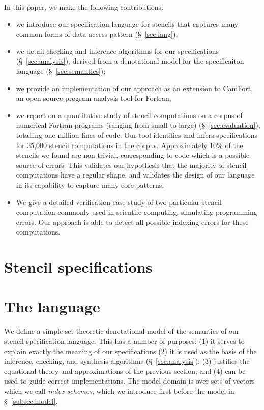 \documentclass[9pt,preprint]{sigplanconf}
\theoremstyle{definition}
\begin{document}
In this paper, we make the following contributions:
%
\begin{itemize}
\item we introduce our specification language for stencils
  that captures many common forms of data access pattern
  (\S~\ref{sec:lang});

\item we detail checking and inference algorithms for our
  specifications (\S~\ref{sec:analysis}), derived from a
  denotational model for the specificaiton language
  (\S~\ref{sec:semantics});

\item we provide an implementation of our approach as an extension to
  CamFort, an open-source program analysis tool for Fortran;

\item we report on a quantitative study of stencil computations on a
  corpus of numerical Fortran programs (ranging from small to large)
  (\S~\ref{sec:evaluation}), totalling one million lines of code. Our tool
  identifies and infers specifications for 35,000 stencil computations in the
  corpus. Approximately 10\% of the stencils we found are non-trivial,
  corresponding to code which is a possible source of errors. This validates
  our hypothesis that the majority of stencil computations have a regular
  shape, and validates the design of our language in its capability to capture
  many core patterns.

\item We give a detailed verification case study of two
  particular stencil computation commonly used in scientifc computing,
  simulating programming errors. Our approach is able to detect all
  possible indexing errors for these computations.
\end{itemize}
%

\newcommand{\domainVal}{\mathbb{Z}_\infty}
\section{Stencil specifications}

\section{The language}

We define a simple set-theoretic denotational model of the semantics
of our stencil specification language. This has a number of purposes:
(1) it serves to explain exactly the meaning of our specifications
(2) it is 
used as the basis of the inference, checking, and synthesis algorithms
(\S~\ref{sec:analysis}); (3) justifies the equational theory and
approximations of the previous section; and (4) can be used to guide
correct implementations. The model domain is over sets of vectors
which we call \emph{index schemes}, which we introduce first before
the model in \S~\ref{subsec:model}.


\end{document}
